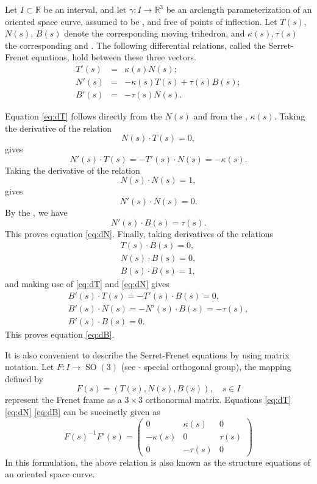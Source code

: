 \documentclass[12pt]{article}
\newcommand{\reals}{\mathbb{R}}
\newcommand{\SO}{\operatorname{SO}}
\begin{document}
Let $I\subset\reals$ be an interval, and let $\gamma:I\to\reals^3$ be
an arclength parameterization of an oriented space curve, assumed to
be , and free of points of inflection.  Let $T(s)$, $N(s)$,
$B(s)$ denote the corresponding moving trihedron, and $\kappa(s),
\tau(s)$ the corresponding 
and .  The following
differential relations, called the Serret-Frenet equations, hold
between these three vectors.
\begin{eqnarray}
\label{eq:dT}
T'(s) &=& \kappa(s) N(s);\\
\label{eq:dN}
N'(s) &=& -\kappa(s) T(s) + \tau(s)B(s); \\
\label{eq:dB}
B'(s) &=& -\tau(s) N(s).
\end{eqnarray}

Equation \eqref{eq:dT} follows directly from the  $N(s)$ and from the , $\kappa(s)$. Taking the derivative of
the relation 
$$N(s)\cdot T(s) = 0,$$
gives
$$N'(s)\cdot T(s)  = - T'(s) \cdot N(s) = -\kappa(s).$$
Taking the derivative of the relation
$$N(s)\cdot N(s) = 1,$$
gives
$$N'(s) \cdot N(s) = 0.$$
By the , we have
$$N'(s)\cdot B(s) = \tau(s).$$
This proves equation \eqref{eq:dN}.
Finally,
taking derivatives of the relations
\begin{gather*}
T(s)\cdot B(s) = 0,\\
N(s)\cdot B(s) = 0,\\
B(s)\cdot B(s) =1,  
\end{gather*}
and making use of \eqref{eq:dT} and \eqref{eq:dN}
gives
\begin{gather*}
B'(s) \cdot T(s) = -T'(s)\cdot B(s) = 0,\\
B'(s) \cdot N(s) = -N'(s)\cdot B(s) = -\tau(s),\\
B'(s)\cdot B(s) = 0.  
\end{gather*}
This proves equation \eqref{eq:dB}.

It is also convenient to describe the Serret-Frenet equations by using
matrix notation.  Let $F:I \to \SO(3)$ (see - special orthogonal
group), the mapping defined by
$$F(s) = (T(s),N(s),B(s)),\quad s\in I$$
represent the Frenet frame as a $3\times 3$ orthonormal
matrix.  Equations \eqref{eq:dT} \eqref{eq:dN} \eqref{eq:dB} can be
succinctly given as
$$F(s)^{-1} F'(s) = 
\begin{pmatrix}
  0 & \kappa(s) & 0 \\
  -\kappa(s)  & 0 & \tau(s) \\
  0 & -\tau(s) & 0
\end{pmatrix}
$$
In this formulation, the above relation is also known as the structure
equations of an oriented space curve.
\end{document}
